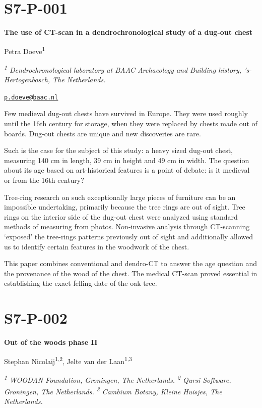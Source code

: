 \documentclass[
]{book}
\begin{document}
\hypertarget{s7-p-001}{%
\section*{S7-P-001}\label{s7-p-001}}

\textbf{The use of CT-scan in a dendrochronological study of a dug-out chest}

Petra Doeve\textsuperscript{1}

\emph{\textsuperscript{1} Dendrochronological laboratory at BAAC Archaeology and Building history, 's-Hertogenbosch, The Netherlands.}

\href{mailto:p.doeve@baac.nl}{\nolinkurl{p.doeve@baac.nl}}

Few medieval dug-out chests have survived in Europe. They were used roughly until the 16th century for storage, when they were replaced by chests made out of boards. Dug-out chests are unique and new discoveries are rare.

Such is the case for the subject of this study: a heavy sized dug-out chest, measuring 140 cm in length, 39 cm in height and 49 cm in width. The question about its age based on art-historical features is a point of debate: is it medieval or from the 16th century?

Tree-ring research on such exceptionally large pieces of furniture can be an impossible undertaking, primarily because the tree rings are out of sight. Tree rings on the interior side of the dug-out chest were analyzed using standard methods of measuring from photos. Non-invasive analysis through CT-scanning `exposed' the tree-rings patterns previously out of sight and additionally allowed us to identify certain features in the woodwork of the chest.

This paper combines conventional and dendro-CT to answer the age question and the provenance of the wood of the chest. The medical CT-scan proved essential in establishing the exact felling date of the oak tree.

\hypertarget{s7-p-002}{%
\section*{S7-P-002}\label{s7-p-002}}

\textbf{Out of the woods phase II}

Stephan Nicolaij\textsuperscript{1,2}, Jelte van der Laan\textsuperscript{1,3}

\emph{\textsuperscript{1} WOODAN Foundation, Groningen, The Netherlands. \textsuperscript{2} Qursi Software, Groningen, The Netherlands. \textsuperscript{3} Cambium Botany, Kleine Huisjes, The Netherlands.}
\end{document}
